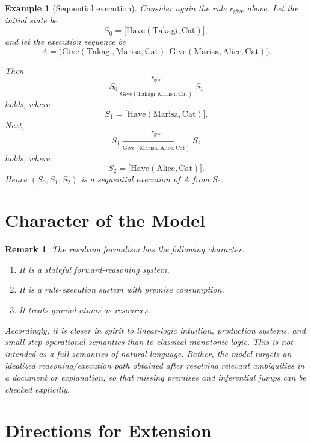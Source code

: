 \documentclass[11pt]{article}
\newtheorem{remark}[definition]{Remark}
\newtheorem{example}[definition]{Example}
\begin{document}
\begin{example}[Sequential execution]
Consider again the rule $r_{\mathrm{give}}$ above.
Let the initial state be
\[
S_0=
\bigl[
\mathrm{Have}(\mathrm{Takagi},\mathrm{Cat})
\bigr],
\]
and let the execution sequence be
\[
A=
\bigl(
\mathrm{Give}(\mathrm{Takagi},\mathrm{Marisa},\mathrm{Cat}),
\mathrm{Give}(\mathrm{Marisa},\mathrm{Alice},\mathrm{Cat})
\bigr).
\]

Then
\[
S_0 \xrightarrow[\mathrm{Give}(\mathrm{Takagi},\mathrm{Marisa},\mathrm{Cat})]{r_{\mathrm{give}}} S_1
\]
holds, where
\[
S_1=
\bigl[
\mathrm{Have}(\mathrm{Marisa},\mathrm{Cat})
\bigr].
\]
Next,
\[
S_1 \xrightarrow[\mathrm{Give}(\mathrm{Marisa},\mathrm{Alice},\mathrm{Cat})]{r_{\mathrm{give}}} S_2
\]
holds, where
\[
S_2=
\bigl[
\mathrm{Have}(\mathrm{Alice},\mathrm{Cat})
\bigr].
\]
Hence $(S_0,S_1,S_2)$ is a sequential execution of $A$ from $S_0$.
\end{example}

\section{Character of the Model}

\begin{remark}
The resulting formalism has the following character.
\begin{enumerate}[label=\arabic*.]
\item It is a stateful forward-reasoning system.
\item It is a rule-execution system with premise consumption.
\item It treats ground atoms as resources.
\end{enumerate}
Accordingly, it is closer in spirit to linear-logic intuition, production systems, and small-step operational semantics than to classical monotonic logic.
This is not intended as a full semantics of natural language. Rather, the model targets an idealized reasoning/execution path obtained after resolving relevant ambiguities in a document or explanation, so that missing premises and inferential jumps can be checked explicitly.
\end{remark}

\section{Directions for Extension}
\end{document}
